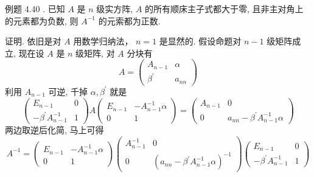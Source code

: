\documentclass{article}
\begin{document}
{\heiti 例题 4.40 .} {\kaishu 已知 $A$ 是 $n$ 级实方阵, $A$ 的所有顺床主子式都大于零, 且非主对角上的元素都为负数, 则 $A^{-1}$ 的元索都为正数.}

{\heiti 证明.} 依旧是对 $A$ 用数学归纳法， $n=1$ 是显然的. 假设命题对 $n-1$ 级矩阵成立, 现在设 $A$ 是 $n$ 级矩阵, 对 $A$ 分块有
\begin{equation*}
    A=\left(\begin{array}{cc}
        A_{n-1}        & \alpha  \\
        \beta^{\prime} & a_{n n}
    \end{array}\right)
\end{equation*}
利用 $A_{n-1}$ 可逆, 千掉 $\alpha, \beta^{\prime}$ 就是
\begin{equation*}
    \left(\begin{array}{cc}
        E_{n-1}                      & 0 \\
        -\beta^{\prime} A_{n-1}^{-1} & 1
    \end{array}\right) A\left(\begin{array}{cc}
        E_{n-1} & -A_{n-1}^{-1} \alpha \\
        0       & 1
    \end{array}\right)=\left(\begin{array}{cc}
        A_{n-1} & 0                                          \\
        0       & a_{n n}-\beta^{\prime} A_{n-1}^{-1} \alpha
    \end{array}\right)
\end{equation*}
两边取逆后化简, 马上可得
\begin{equation*}
    A^{-1}=\left(\begin{array}{cc}
            E_{n-1} & -A_{n-1}^{-1} \alpha \\
            0       & 1
        \end{array}\right)\left(\begin{array}{cc}
            A_{n-1}^{-1} & 0                                                            \\
            0            & \left(a_{n n}-\beta^{\prime} A_{n-1}^{-1} \alpha\right)^{-1}
        \end{array}\right)\left(\begin{array}{cc}
            E_{n-1}                      & 0 \\
            -\beta^{\prime} A_{n-1}^{-1} & 1
        \end{array}\right)
\end{equation*}
\end{document}
